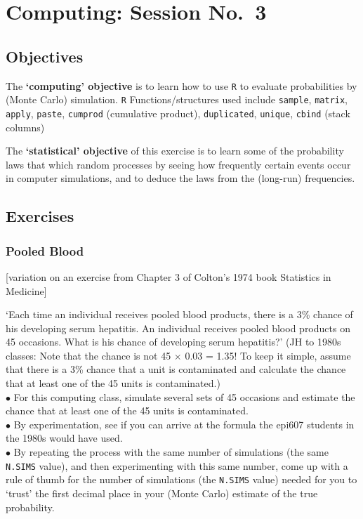 \documentclass[]{book}
\begin{document}
\hypertarget{computing03}{%
\chapter{Computing: Session No.~3}\label{computing03}}

\hypertarget{objectives-1}{%
\section{Objectives}\label{objectives-1}}

The \textbf{`computing' objective} is to learn how to use \texttt{R} to evaluate probabilities by (Monte Carlo) simulation. \texttt{R} Functions/structures used include \texttt{sample}, \texttt{matrix}, \texttt{apply}, \texttt{paste}, \texttt{cumprod} (cumulative product), \texttt{duplicated}, \texttt{unique}, \texttt{cbind} (stack columns)

The \textbf{`statistical' objective} of this exercise is to learn some of the probability laws that which random processes by seeing how frequently certain events occur in computer simulations, and to deduce the laws from the (long-run) frequencies.

\hypertarget{exercises-5}{%
\section{Exercises}\label{exercises-5}}

\hypertarget{pooled-blood}{%
\subsection{Pooled Blood}\label{pooled-blood}}

{[}variation on an exercise from Chapter 3 of Colton's 1974 book Statistics in Medicine{]}

`Each time an individual receives pooled blood products, there is a 3\% chance of his developing serum hepatitis. An individual receives pooled blood products on 45 occasions. What is his chance of developing serum hepatitis?' (JH to 1980s classes: Note that the chance is not 45 \(\times\) 0.03 = 1.35! To keep it simple, assume that there is a 3\% chance that a unit is contaminated and calculate the chance that at least one of the 45 units is contaminated.)\\
\(\bullet\) For this computing class, simulate several sets of 45 occasions and estimate the chance that at least one of the 45 units is contaminated.\\
\(\bullet\) By experimentation, see if you can arrive at the formula the epi607 students in the 1980s would have used.\\
\(\bullet\) By repeating the process with the same number of simulations (the same \texttt{N.SIMS} value), and then experimenting with this same number, come up with a rule of thumb for the number of simulations (the \texttt{N.SIMS} value) needed for you to `trust' the first decimal place in your (Monte Carlo) estimate of the true probability.
\end{document}
